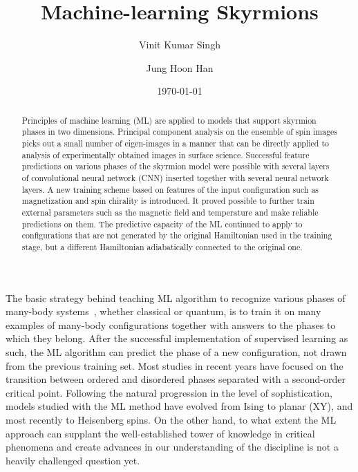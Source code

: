 \documentclass[reprint,amsmath,amssymb,aps,showpacs,superscriptaddress,prl]{revtex4-1}
\begin{document}
%
\title{Machine-learning Skyrmions}

\author{Vinit Kumar Singh}
\author{Jung Hoon Han}
\date{\today}

\begin{abstract}
Principles of machine learning (ML) are applied to models that support skyrmion phases in two dimensions. Principal component analysis on the ensemble of spin images picks out a small number of eigen-images in a manner that can be directly applied to analysis of experimentally obtained images in surface science. Successful feature predictions on various phases of the skyrmion model were possible with several layers of convolutional neural network (CNN) inserted together with several neural network layers. A new training scheme based on features of the input configuration such as magnetization and spin chirality is introduced. It proved possible to further train external parameters such as the magnetic field and temperature and make reliable predictions on them. The predictive capacity of the ML continued to apply to configurations that are not generated by the original Hamiltonian used in the training stage, but a different Hamiltonian adiabatically connected to the original one.
\end{abstract}
\maketitle

The basic strategy behind teaching ML algorithm to recognize various phases of many-body systems~\cite{melko16,wang16,melko17,melko17b,melko17c,tanaka17,scalettar17,wetzel17,wetzel17b,iso18,kim18,zhai17,scalettar17,beach18,zhai18,russian18}, whether classical or quantum, is to train it on many examples of many-body configurations together with answers to the phases to which they belong.  After the successful implementation of supervised learning as such, the ML algorithm can predict the phase of a new configuration, not drawn from the previous training set. Most studies in recent years have focused on the transition between ordered and disordered phases separated with a second-order critical point. Following the natural progression in the level of sophistication, models studied with the ML method have evolved from Ising\cite{melko16,wang16,melko17,melko17b,melko17c,tanaka17,scalettar17,wetzel17,wetzel17b,iso18,kim18} to planar (XY)\cite{zhai17,scalettar17,wetzel17b,beach18,zhai18}, and most recently to Heisenberg\cite{russian18} spins. On the other hand, to what extent the ML approach can supplant the well-established tower of knowledge in critical phenomena and create advances in our understanding of the discipline is not a heavily challenged question yet.
\end{document}
